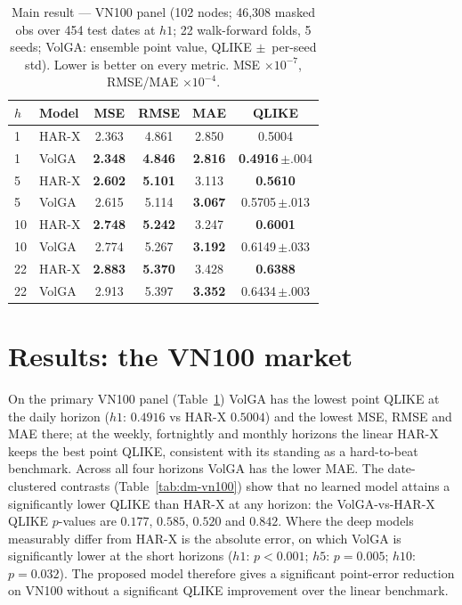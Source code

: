 \documentclass[runningheads]{llncs}
\begin{document}
\begin{table}[t]
\centering
\caption{Main result --- VN100 panel (102 nodes; 46{,}308 masked obs over 454 test dates at $h1$;
22 walk-forward folds, 5 seeds; VolGA: ensemble point value, QLIKE $\pm$~per-seed std). Lower is
better on every metric. MSE $\times10^{-7}$, RMSE/MAE $\times10^{-4}$.}
\label{tab:vn100main}
\footnotesize
\setlength{\tabcolsep}{6pt}
\begin{tabular}{llcccc}
\toprule
$h$ & Model & MSE & RMSE & MAE & QLIKE \\
\midrule
1 & HAR-X & 2.363 & 4.861 & 2.850 & 0.5004 \\
1 & VolGA & \textbf{2.348} & \textbf{4.846} & \textbf{2.816} & \textbf{0.4916}\,$\pm$.004 \\
\midrule
5 & HAR-X & \textbf{2.602} & \textbf{5.101} & 3.113 & \textbf{0.5610} \\
5 & VolGA & 2.615 & 5.114 & \textbf{3.067} & 0.5705\,$\pm$.013 \\
\midrule
10 & HAR-X & \textbf{2.748} & \textbf{5.242} & 3.247 & \textbf{0.6001} \\
10 & VolGA & 2.774 & 5.267 & \textbf{3.192} & 0.6149\,$\pm$.033 \\
\midrule
22 & HAR-X & \textbf{2.883} & \textbf{5.370} & 3.428 & \textbf{0.6388} \\
22 & VolGA & 2.913 & 5.397 & \textbf{3.352} & 0.6434\,$\pm$.003 \\
\bottomrule
\end{tabular}
\end{table}

\section{Results: the VN100 market}\label{sec:results}
On the primary VN100 panel (Table~\ref{tab:vn100main}) VolGA has the lowest point QLIKE at the daily
horizon ($h1$: $0.4916$ vs HAR-X $0.5004$) and the lowest MSE, RMSE and MAE there; at the weekly,
fortnightly and monthly horizons the linear HAR-X keeps the best point QLIKE, consistent with its
standing as a hard-to-beat benchmark. Across all four horizons VolGA has the lower MAE. The
date-clustered contrasts (Table~\ref{tab:dm-vn100}) show that no learned model attains a significantly
lower QLIKE than HAR-X at any horizon: the VolGA-vs-HAR-X QLIKE $p$-values are $0.177$, $0.585$,
$0.520$ and $0.842$. Where the deep models measurably differ from HAR-X is the absolute error, on
which VolGA is significantly lower at the short horizons ($h1$: $p<0.001$; $h5$: $p=0.005$; $h10$:
$p=0.032$). The proposed model therefore gives a significant point-error reduction on VN100 without a
significant QLIKE improvement over the linear benchmark.
\end{document}

